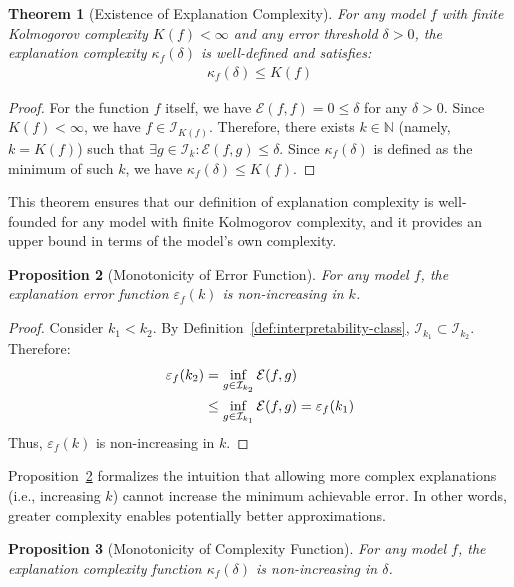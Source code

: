 \documentclass[11pt,letter,leqno]{article}
\newtheorem{theorem}{Theorem}[section]
\newtheorem{proposition}[theorem]{Proposition}
\begin{document}
\begin{theorem}[Existence of Explanation Complexity]
\label{thm:existence}
For any model $f$ with finite Kolmogorov complexity $K(f) < \infty$ and any error threshold $\delta > 0$, the explanation complexity $\kappa_f(\delta)$ is well-defined and satisfies:
\begin{align}
\kappa_f(\delta) \leq K(f)
\end{align}
\end{theorem}

\begin{proof}
For the function $f$ itself, we have $\mathcal{E}(f, f) = 0 \leq \delta$ for any $\delta > 0$.  Since $K(f) < \infty$, we have $f \in \mathcal{I}_{K(f)}$.  Therefore, there exists $k \in \mathbb{N}$ (namely, $k = K(f)$) such that $\exists g \in \mathcal{I}_k : \mathcal{E}(f, g) \leq \delta$.  Since $\kappa_f(\delta)$ is defined as the minimum of such $k$, we have $\kappa_f(\delta) \leq K(f)$.
\end{proof}

This theorem ensures that our definition of explanation complexity is well-founded for any model with finite Kolmogorov complexity, and it provides an upper bound in terms of the model's own complexity.

\begin{proposition}[Monotonicity of Error Function]
\label{prop:error-monotonicity}
For any model $f$, the explanation error function $\varepsilon_f(k)$ is non-increasing in $k$.
\end{proposition}

\begin{proof}
Consider $k_1 < k_2$. By Definition~\ref{def:interpretability-class}, $\mathcal{I}_{k_1} \subset \mathcal{I}_{k_2}$. Therefore:
\begin{align}
\varepsilon_f(k_2) &= \inf_{g \in \mathcal{I}_{k_2}} \mathcal{E}(f, g) \notag \\
&\leq \inf_{g \in \mathcal{I}_{k_1}} \mathcal{E}(f, g) = \varepsilon_f(k_1)
\end{align}
Thus, $\varepsilon_f(k)$ is non-increasing in $k$.
\end{proof}

Proposition~\ref{prop:error-monotonicity} formalizes the intuition that allowing more complex explanations (i.e., increasing $k$) cannot increase the minimum achievable error.  In other words, greater complexity enables potentially better approximations.

\begin{proposition}[Monotonicity of Complexity Function]
\label{prop:complexity-monotonicity}
For any model $f$, the explanation complexity function $\kappa_f(\delta)$ is non-increasing in $\delta$.
\end{proposition}
\end{document}
